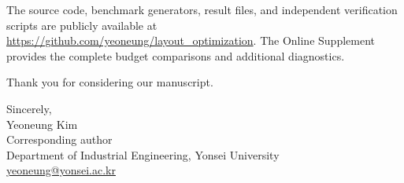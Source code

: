 \documentclass[11pt,a4paper]{article}
\begin{document}
The source code, benchmark generators, result files, and independent verification
scripts are publicly available at
\url{https://github.com/yeoneung/layout_optimization}. The Online Supplement
provides the complete budget comparisons and additional diagnostics.


Thank you for considering our manuscript.

Sincerely,\\
Yeoneung Kim\\
Corresponding author\\
Department of Industrial Engineering, Yonsei University\\
\href{mailto:yeoneung@yonsei.ac.kr}{yeoneung@yonsei.ac.kr}
\end{document}

